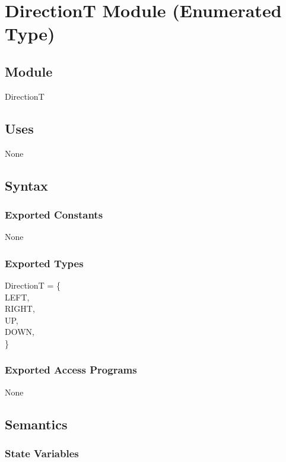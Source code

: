 \documentclass[12pt]{article}
\begin{document}
\newpage

\section* {DirectionT Module (Enumerated Type)}

\subsection*{Module}

DirectionT

\subsection* {Uses}

None

\subsection* {Syntax}

\subsubsection* {Exported Constants}

None

\subsubsection* {Exported Types}

DirectionT = \{\\
    LEFT, \\
    RIGHT, \\ 
    UP, \\ 
    DOWN, \\
\}

\subsubsection* {Exported Access Programs}

None

\subsection* {Semantics}

\subsubsection* {State Variables}
\end{document}
